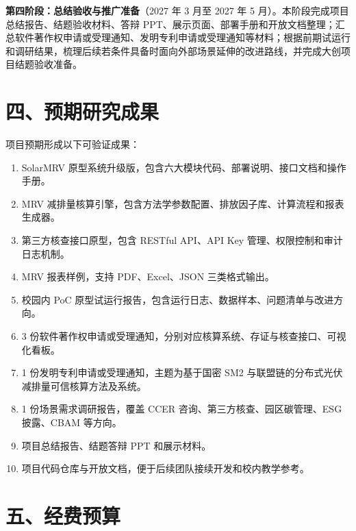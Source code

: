 \documentclass[12pt,a4paper]{article}
\begin{document}
\textbf{第四阶段：总结验收与推广准备}（2027 年 3 月至 2027 年 5 月）。本阶段完成项目总结报告、结题验收材料、答辩 PPT、展示页面、部署手册和开放文档整理；汇总软件著作权申请或受理通知、发明专利申请或受理通知等材料；根据前期试运行和调研结果，梳理后续若条件具备时面向外部场景延伸的改进路线，并完成大创项目结题验收准备。


\newpage
\section*{四、预期研究成果}

项目预期形成以下可验证成果：

\begin{enumerate}[label=\arabic*.,itemsep=0.3em]
  \item SolarMRV 原型系统升级版，包含六大模块代码、部署说明、接口文档和操作手册。
  \item MRV 减排量核算引擎，包含方法学参数配置、排放因子库、计算流程和报表生成器。
  \item 第三方核查接口原型，包含 RESTful API、API Key 管理、权限控制和审计日志机制。
  \item MRV 报表样例，支持 PDF、Excel、JSON 三类格式输出。
  \item 校园内 PoC 原型试运行报告，包含运行日志、数据样本、问题清单与改进方向。
  \item 3 份软件著作权申请或受理通知，分别对应核算系统、存证与核查接口、可视化看板。
  \item 1 份发明专利申请或受理通知，主题为基于国密 SM2 与联盟链的分布式光伏减排量可信核算方法及系统。
  \item 1 份场景需求调研报告，覆盖 CCER 咨询、第三方核查、园区碳管理、ESG 披露、CBAM 等方向。
  \item 项目总结报告、结题答辩 PPT 和展示材料。
  \item 项目代码仓库与开放文档，便于后续团队接续开发和校内教学参考。
\end{enumerate}


\newpage
\section*{五、经费预算}
\end{document}
